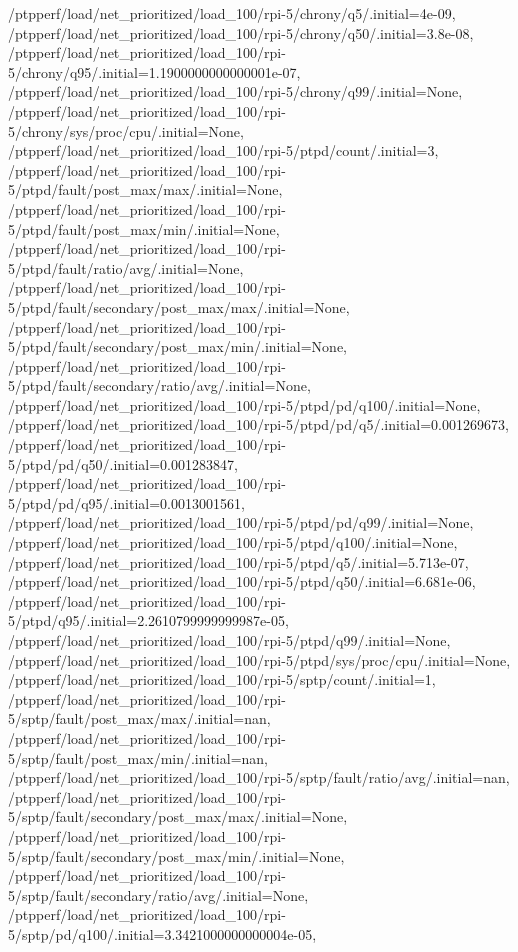 {    /ptpperf/load/net_prioritized/load_100/rpi-5/chrony/q5/.initial=4e-09,
    /ptpperf/load/net_prioritized/load_100/rpi-5/chrony/q50/.initial=3.8e-08,
    /ptpperf/load/net_prioritized/load_100/rpi-5/chrony/q95/.initial=1.1900000000000001e-07,
    /ptpperf/load/net_prioritized/load_100/rpi-5/chrony/q99/.initial=None,
    /ptpperf/load/net_prioritized/load_100/rpi-5/chrony/sys/proc/cpu/.initial=None,
    /ptpperf/load/net_prioritized/load_100/rpi-5/ptpd/count/.initial=3,
    /ptpperf/load/net_prioritized/load_100/rpi-5/ptpd/fault/post_max/max/.initial=None,
    /ptpperf/load/net_prioritized/load_100/rpi-5/ptpd/fault/post_max/min/.initial=None,
    /ptpperf/load/net_prioritized/load_100/rpi-5/ptpd/fault/ratio/avg/.initial=None,
    /ptpperf/load/net_prioritized/load_100/rpi-5/ptpd/fault/secondary/post_max/max/.initial=None,
    /ptpperf/load/net_prioritized/load_100/rpi-5/ptpd/fault/secondary/post_max/min/.initial=None,
    /ptpperf/load/net_prioritized/load_100/rpi-5/ptpd/fault/secondary/ratio/avg/.initial=None,
    /ptpperf/load/net_prioritized/load_100/rpi-5/ptpd/pd/q100/.initial=None,
    /ptpperf/load/net_prioritized/load_100/rpi-5/ptpd/pd/q5/.initial=0.001269673,
    /ptpperf/load/net_prioritized/load_100/rpi-5/ptpd/pd/q50/.initial=0.001283847,
    /ptpperf/load/net_prioritized/load_100/rpi-5/ptpd/pd/q95/.initial=0.0013001561,
    /ptpperf/load/net_prioritized/load_100/rpi-5/ptpd/pd/q99/.initial=None,
    /ptpperf/load/net_prioritized/load_100/rpi-5/ptpd/q100/.initial=None,
    /ptpperf/load/net_prioritized/load_100/rpi-5/ptpd/q5/.initial=5.713e-07,
    /ptpperf/load/net_prioritized/load_100/rpi-5/ptpd/q50/.initial=6.681e-06,
    /ptpperf/load/net_prioritized/load_100/rpi-5/ptpd/q95/.initial=2.2610799999999987e-05,
    /ptpperf/load/net_prioritized/load_100/rpi-5/ptpd/q99/.initial=None,
    /ptpperf/load/net_prioritized/load_100/rpi-5/ptpd/sys/proc/cpu/.initial=None,
    /ptpperf/load/net_prioritized/load_100/rpi-5/sptp/count/.initial=1,
    /ptpperf/load/net_prioritized/load_100/rpi-5/sptp/fault/post_max/max/.initial=nan,
    /ptpperf/load/net_prioritized/load_100/rpi-5/sptp/fault/post_max/min/.initial=nan,
    /ptpperf/load/net_prioritized/load_100/rpi-5/sptp/fault/ratio/avg/.initial=nan,
    /ptpperf/load/net_prioritized/load_100/rpi-5/sptp/fault/secondary/post_max/max/.initial=None,
    /ptpperf/load/net_prioritized/load_100/rpi-5/sptp/fault/secondary/post_max/min/.initial=None,
    /ptpperf/load/net_prioritized/load_100/rpi-5/sptp/fault/secondary/ratio/avg/.initial=None,
    /ptpperf/load/net_prioritized/load_100/rpi-5/sptp/pd/q100/.initial=3.3421000000000004e-05,
}
